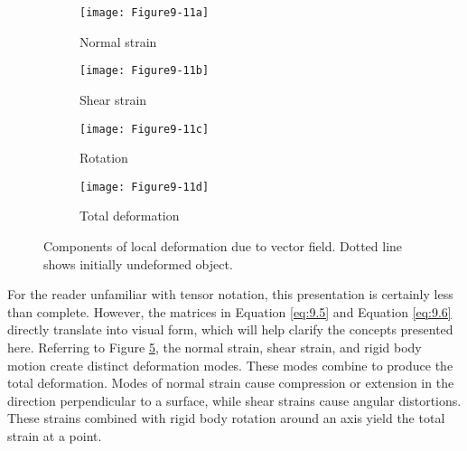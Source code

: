 \begin{figure}[htb]
	\begin{subfigure}[h]{0.48\linewidth}
		\texttt{[image: Figure9-11a]}
		\captionsetup{justification=centering}
		\caption{Normal strain}
		\label{fig:Figure9-11a}
	\end{subfigure}
	\hfill
	\begin{subfigure}[h]{0.48\linewidth}
		\texttt{[image: Figure9-11b]}
		\captionsetup{justification=centering}
		\caption{Shear strain}
		\label{fig:Figure9-11b}
	\end{subfigure}
	\hfill
	\begin{subfigure}[h]{0.48\linewidth}
		\texttt{[image: Figure9-11c]}
		\captionsetup{justification=centering}
		\caption{Rotation}
		\label{fig:Figure9-11c}
	\end{subfigure}
	\hfill
		\begin{subfigure}[h]{0.48\linewidth}
		\texttt{[image: Figure9-11d]}
		\captionsetup{justification=centering}
		\caption{Total deformation}
		\label{fig:Figure9-11d}
	\end{subfigure}
	\caption{Components of local deformation due to vector field. Dotted line shows initially undeformed object.}\label{fig:Figure9-11}
\end{figure}

For the reader unfamiliar with tensor notation, this presentation is certainly less than complete. However, the matrices in Equation \ref{eq:9.5} and Equation \ref{eq:9.6} directly translate into visual form, which will help clarify the concepts presented here. Referring to Figure \ref{fig:Figure9-11}, the normal strain, shear strain, and rigid body motion create distinct deformation modes. These modes combine to produce the total deformation. Modes of normal strain cause compression or extension in the direction perpendicular to a surface, while shear strains cause angular distortions. These strains combined with rigid body rotation around an axis yield the total strain at a point.

